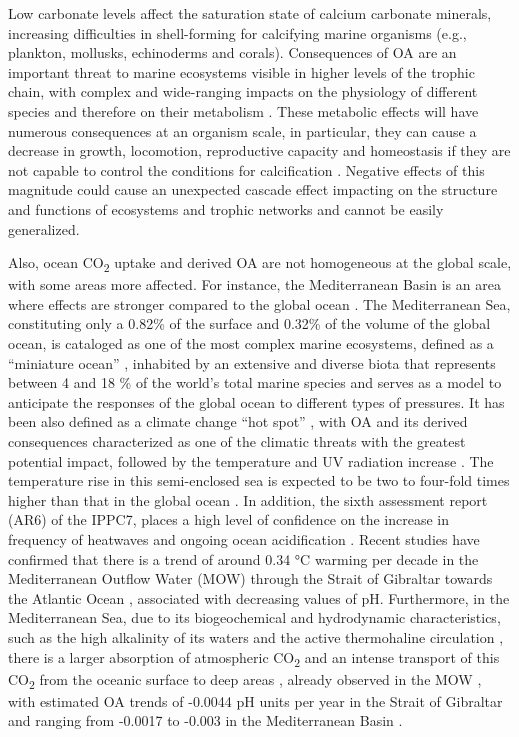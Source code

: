 Low carbonate levels affect the saturation state of calcium carbonate minerals,
increasing difficulties in shell-forming for calcifying marine organisms (e.g.,
plankton, mollusks, echinoderms and corals). Consequences of OA are an
important threat to marine ecosystems visible in higher levels of the trophic
chain, with complex and wide-ranging impacts on the physiology of different
species and therefore on their
metabolism \cite{kroeker2013impacts,nilsson2012near}. These metabolic effects
will have numerous consequences at an organism scale, in particular, they can
cause a decrease in growth, locomotion, reproductive capacity and homeostasis
if they are not capable to control the conditions for
calcification \cite{hendriks2015biological}. Negative effects of this magnitude
could cause an unexpected cascade effect impacting on the structure and
functions of ecosystems and trophic networks \cite{zunino2021impact} and cannot
be easily generalized.

Also, ocean CO\textsubscript{2} uptake and derived OA are not homogeneous
at the global scale, with some areas more affected. For instance, the
Mediterranean Basin is an area where effects are stronger compared to the
global ocean \cite{Giorgi2006}. The Mediterranean Sea, constituting only a
0.82\% of the surface and 0.32\% of the volume of the global ocean, is
cataloged as one of the most complex marine ecosystems, defined as a “miniature
ocean” \cite{bethoux1999mediterranean}, inhabited by an extensive and diverse
biota that represents between 4 and 18 \% of the world's total marine species
\cite{Bianchi2000} and serves as a model \cite{bethoux1999mediterranean} to
anticipate the responses of the global ocean to different types of pressures.
It has been also defined as a climate change ``hot spot'' \cite{Giorgi2006},
with OA and its derived consequences characterized as one of the climatic
threats with the greatest potential impact, followed by the temperature and UV
radiation increase \cite{micheli2013}. The temperature rise in this
semi-enclosed sea is expected to be two to four-fold times higher than that in
the global ocean \cite{vargas2008w, vargas2010}. In addition, the sixth
assessment report (AR6) of the IPPC7, places a high level of confidence on the
increase in frequency of heatwaves and ongoing ocean
acidification \cite{Masson-Delmotte2021}. Recent studies have confirmed that
there is a trend of around 0.34 °C warming per decade in the Mediterranean
Outflow Water (MOW) through the Strait of Gibraltar towards the Atlantic Ocean
\cite{Garcia-Lafuente2021}, associated with decreasing values of pH.
Furthermore, in the Mediterranean Sea, due to its biogeochemical and
hydrodynamic characteristics, such as the high alkalinity of its waters and the
active thermohaline circulation \cite{Alvarez2014}, there is a larger
absorption of atmospheric CO\textsubscript{2} and an intense transport of this
CO\textsubscript{2} from the oceanic surface to deep
areas \cite{Hassoun2015,Palmieri2015}, already observed in the MOW
\cite{Flecha2015,Flecha2019}, with estimated OA trends of -0.0044 pH units per
year in the Strait of Gibraltar \cite{Flecha2015} and ranging from -0.0017 to
-0.003 in the Mediterranean Basin \cite{Kapsenberg2017,yao2016}.

